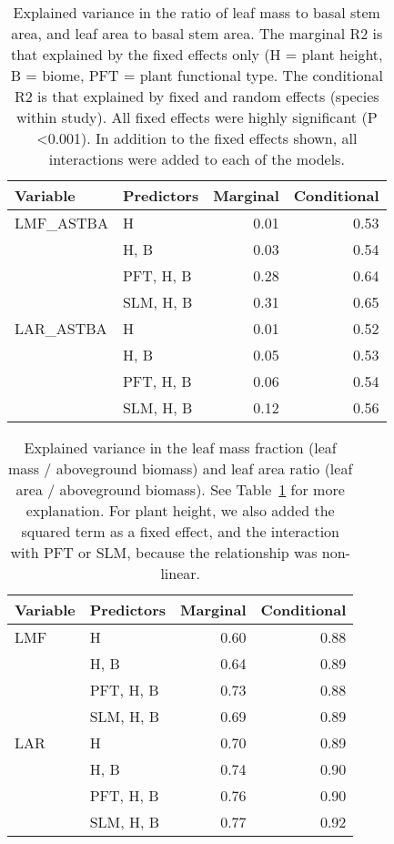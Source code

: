 \documentclass[a4paper]{article}\usepackage[]{graphicx}\usepackage[]{color}
\begin{document}
\begin{table}[ht]
\centering
\caption{Explained variance in the ratio of leaf mass to basal stem area, and leaf area to basal stem area. The marginal R2 is that explained by the fixed effects only (H = plant height, B = biome, PFT = plant functional type. The conditional R2 is that explained by fixed and random effects (species within study). All fixed effects were highly significant (P \textless 0.001). In addition to the fixed effects shown, all interactions were added to each of the models.} 
\label{varpartpipe}
\begin{tabular}{llrr}
  \hline
Variable & Predictors & Marginal & Conditional \\ 
  \hline
LMF\_ASTBA & H & 0.01 & 0.53 \\ 
   & H, B & 0.03 & 0.54 \\ 
   & PFT, H, B & 0.28 & 0.64 \\ 
   & SLM, H, B & 0.31 & 0.65 \\ 
  LAR\_ASTBA & H & 0.01 & 0.52 \\ 
   & H, B & 0.05 & 0.53 \\ 
   & PFT, H, B & 0.06 & 0.54 \\ 
   & SLM, H, B & 0.12 & 0.56 \\ 
   \hline
\end{tabular}
\end{table}



\begin{table}[ht]
\centering
\caption{Explained variance in the leaf mass fraction (leaf mass / aboveground biomass) and leaf area ratio (leaf area / aboveground biomass). See Table~\ref{varpartpipe} for more explanation. For plant height, we also added the squared term as a fixed effect, and the interaction with PFT or SLM, because the relationship was non-linear.} 
\label{varpartlmflar}
\begin{tabular}{llrr}
  \hline
Variable & Predictors & Marginal & Conditional \\ 
  \hline
LMF & H & 0.60 & 0.88 \\ 
   & H, B & 0.64 & 0.89 \\ 
   & PFT, H, B & 0.73 & 0.88 \\ 
   & SLM, H, B & 0.69 & 0.89 \\ 
  LAR & H & 0.70 & 0.89 \\ 
   & H, B & 0.74 & 0.90 \\ 
   & PFT, H, B & 0.76 & 0.90 \\ 
   & SLM, H, B & 0.77 & 0.92 \\ 
   \hline
\end{tabular}
\end{table}
\end{document}
